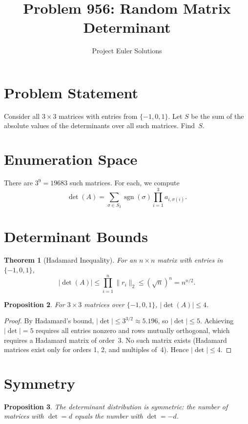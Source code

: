 \documentclass[11pt]{article}
\title{Problem 956: Random Matrix Determinant}
\author{Project Euler Solutions}
\date{}
\newtheorem{theorem}{Theorem}
\newtheorem{proposition}[theorem]{Proposition}
\begin{document}
\maketitle

\section{Problem Statement}

Consider all $3 \times 3$ matrices with entries from $\{-1, 0, 1\}$. Let $S$ be the sum of the absolute values of the determinants over all such matrices. Find~$S$.

\section{Enumeration Space}

There are $3^9 = 19683$ such matrices. For each, we compute
\[
\det(A) = \sum_{\sigma \in S_3} \operatorname{sgn}(\sigma) \prod_{i=1}^{3} a_{i,\sigma(i)}.
\]

\section{Determinant Bounds}

\begin{theorem}[Hadamard Inequality]
For an $n \times n$ matrix with entries in $\{-1, 0, 1\}$,
\[
|\det(A)| \le \prod_{i=1}^{n} \|r_i\|_2 \le (\sqrt{n})^n = n^{n/2}.
\]
\end{theorem}

\begin{proposition}
For $3 \times 3$ matrices over $\{-1, 0, 1\}$, $|\det(A)| \le 4$.
\end{proposition}

\begin{proof}
By Hadamard's bound, $|\det| \le 3^{3/2} \approx 5.196$, so $|\det| \le 5$. Achieving $|\det| = 5$ requires all entries nonzero and rows mutually orthogonal, which requires a Hadamard matrix of order~3. No such matrix exists (Hadamard matrices exist only for orders 1, 2, and multiples of~4). Hence $|\det| \le 4$.
\end{proof}

\section{Symmetry}

\begin{proposition}
The determinant distribution is symmetric: the number of matrices with $\det = d$ equals the number with $\det = -d$.
\end{proposition}
\end{document}
